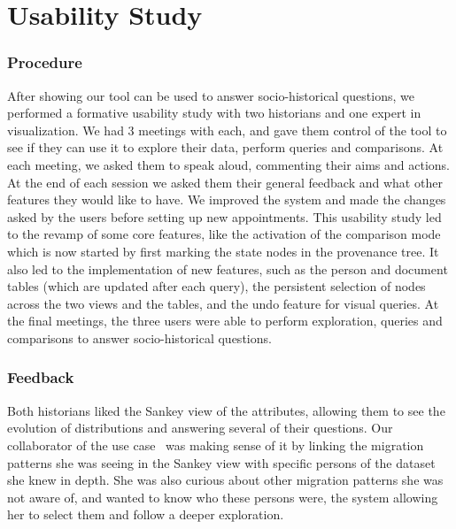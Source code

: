 

\section{Usability Study}\label{sec:usability}

\subsubsection{Procedure}

After showing our tool can be used to answer socio-historical questions, we performed a formative usability study with two historians and one expert in visualization. We had 3 meetings with each, and gave them control of the tool to see if they can use it to explore their data, perform queries and comparisons. At each meeting, we asked them to speak aloud, commenting their aims and actions. At the end of each session we asked them their general feedback and what other features they would like to have. We improved the system and made the changes asked by the users before setting up new appointments. This usability study led to the revamp of some core features, like the activation of the comparison mode which is now started by first marking the state nodes in the provenance tree. It also led to the implementation of new features, such as the person and document tables (which are updated after each query), the persistent selection of nodes across the two views and the tables, and the undo feature for visual queries.
At the final meetings, the three users were able to perform exploration, queries and comparisons to answer socio-historical questions.

\subsubsection{Feedback}

Both historians liked the Sankey view of the attributes, allowing them to see the evolution of distributions and answering several of their questions. Our collaborator of the use case \nicole\ was making sense of it by linking the migration patterns she was seeing in the Sankey view with specific persons of the dataset she knew in depth. She was also curious about other migration patterns she was not aware of, and wanted to know who these persons were, the system allowing her to select them and follow a deeper exploration.

